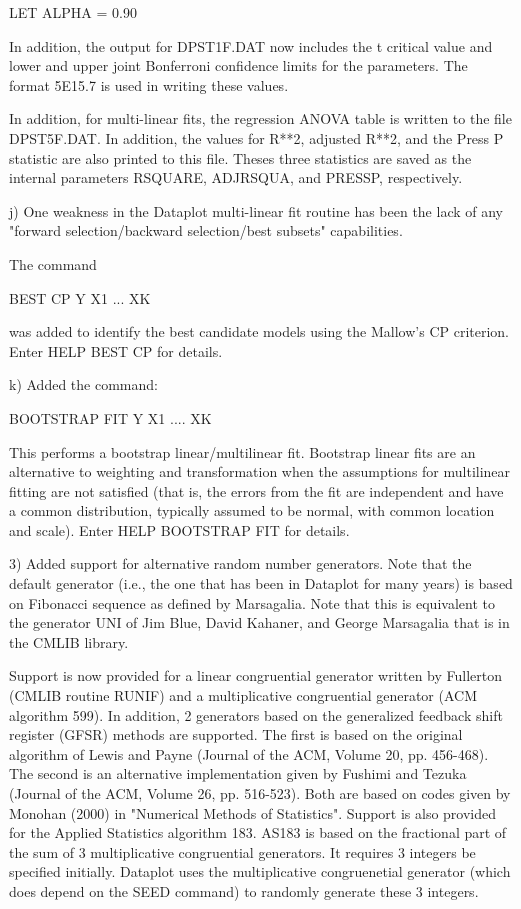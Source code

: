 {            LET ALPHA = 0.90

       In addition, the output for DPST1F.DAT now includes
       the t critical value and lower and upper joint Bonferroni
       confidence limits for the parameters.  The format 5E15.7
       is used in writing these values.

       In addition, for multi-linear fits, the regression ANOVA
       table is written to the file DPST5F.DAT.  In addition, the
       values for R**2, adjusted R**2, and the Press P statistic are
       also printed to this file.  Theses three statistics are
       saved as the internal parameters RSQUARE, ADJRSQUA, and PRESSP,
       respectively.

    j) One weakness in the Dataplot multi-linear fit routine
       has been the lack of any "forward selection/backward
       selection/best subsets" capabilities.

       The command

          BEST CP Y X1 ... XK

      was added to identify the best candidate models using
      the Mallow's CP criterion.  Enter HELP BEST CP for details.

    k) Added the command:

          BOOTSTRAP FIT Y X1 .... XK

       This performs a bootstrap linear/multilinear fit.  Bootstrap
       linear fits are an alternative to weighting and transformation
       when the assumptions for multilinear fitting are not
       satisfied (that is, the errors from the fit are independent and
       have a common distribution, typically assumed to be normal, with
       common location and scale).  Enter HELP BOOTSTRAP FIT for
       details.

 3) Added support for alternative random number generators.  Note
    that the default generator (i.e., the one that has been in
    Dataplot for many years) is based on Fibonacci sequence as
    defined by Marsagalia.  Note that this is equivalent to the
    generator UNI of Jim Blue, David Kahaner, and George Marsagalia
    that is in the CMLIB library.

    Support is now provided for a linear congruential generator
    written by Fullerton (CMLIB routine RUNIF) and a multiplicative
    congruential generator (ACM algorithm 599).  In addition,
    2 generators based on the generalized feedback shift
    register (GFSR) methods are supported.  The first is based on the
    original algorithm of Lewis and Payne (Journal of the ACM,
    Volume 20, pp. 456-468).  The second is an alternative
    implementation given by Fushimi and Tezuka (Journal of the
    ACM, Volume 26, pp. 516-523).  Both are based on codes
    given by Monohan (2000) in "Numerical Methods of Statistics".
    Support is also provided for the Applied Statistics algorithm
    183.  AS183 is based on the fractional part of the sum of 3
    multiplicative congruential generators.  It requires 3 integers
    be specified initially.  Dataplot uses the multiplicative
    congruenetial generator (which does depend on the SEED command)
    to randomly generate these 3 integers.

}
